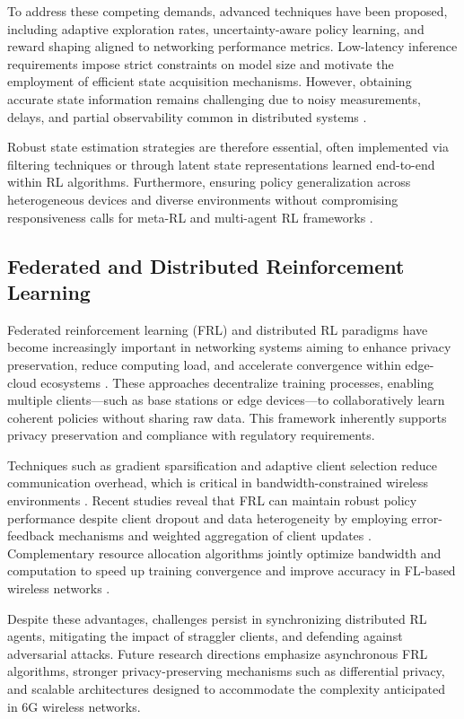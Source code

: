 To address these competing demands, advanced techniques have been proposed, including adaptive exploration rates, uncertainty-aware policy learning, and reward shaping aligned to networking performance metrics. Low-latency inference requirements impose strict constraints on model size and motivate the employment of efficient state acquisition mechanisms. However, obtaining accurate state information remains challenging due to noisy measurements, delays, and partial observability common in distributed systems \cite{ref3}.

Robust state estimation strategies are therefore essential, often implemented via filtering techniques or through latent state representations learned end-to-end within RL algorithms. Furthermore, ensuring policy generalization across heterogeneous devices and diverse environments without compromising responsiveness calls for meta-RL and multi-agent RL frameworks \cite{ref14}.

\subsection{Federated and Distributed Reinforcement Learning}

Federated reinforcement learning (FRL) and distributed RL paradigms have become increasingly important in networking systems aiming to enhance privacy preservation, reduce computing load, and accelerate convergence within edge-cloud ecosystems \cite{ref49,ref50}. These approaches decentralize training processes, enabling multiple clients—such as base stations or edge devices—to collaboratively learn coherent policies without sharing raw data. This framework inherently supports privacy preservation and compliance with regulatory requirements.

Techniques such as gradient sparsification and adaptive client selection reduce communication overhead, which is critical in bandwidth-constrained wireless environments \cite{ref49}. Recent studies reveal that FRL can maintain robust policy performance despite client dropout and data heterogeneity by employing error-feedback mechanisms and weighted aggregation of client updates \cite{ref49}. Complementary resource allocation algorithms jointly optimize bandwidth and computation to speed up training convergence and improve accuracy in FL-based wireless networks \cite{ref50}.

Despite these advantages, challenges persist in synchronizing distributed RL agents, mitigating the impact of straggler clients, and defending against adversarial attacks. Future research directions emphasize asynchronous FRL algorithms, stronger privacy-preserving mechanisms such as differential privacy, and scalable architectures designed to accommodate the complexity anticipated in 6G wireless networks.

